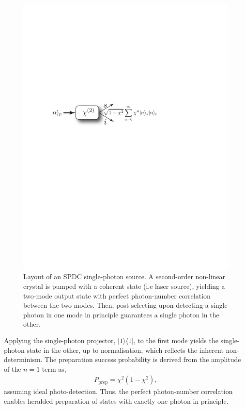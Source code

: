 \documentclass[aps, rmp, twocolumn, amsmath, amssymb, nofootinbib, superscriptaddress, longbibliography, floatfix, table-of-contents, eqsecnum]{revtex4-1}
\newcommand{\bra}[1]{\langle#1|}
\newcommand{\ket}[1]{|#1\rangle}
\begin{document}
\begin{figure}[!htb]
\includegraphics[width=0.9\columnwidth]{SPDC_source}
\caption{Layout of an SPDC single-photon source. A second-order non-linear crystal is pumped with a coherent state (i.e laser source), yielding a two-mode output state with perfect photon-number correlation between the two modes. Then, post-selecting upon detecting a single photon in one mode in principle guarantees a single photon in the other.} \label{fig:SPDC_source}
\end{figure}

Applying the single-photon projector, \mbox{$\ket{1}\bra{1}$}, to the first mode yields the single-photon state in the other, up to normalisation, which reflects the inherent non-determinism. The preparation success probability is derived from the amplitude of the \mbox{$n=1$} term as,
\begin{align} \label{eq:SPDC_p_prep}
P_\text{prep}=\chi^2(1-\chi^2),
\end{align}
assuming ideal photo-detection. Thus, the perfect photon-number correlation enables heralded preparation of states with exactly one photon in principle.
\end{document}
